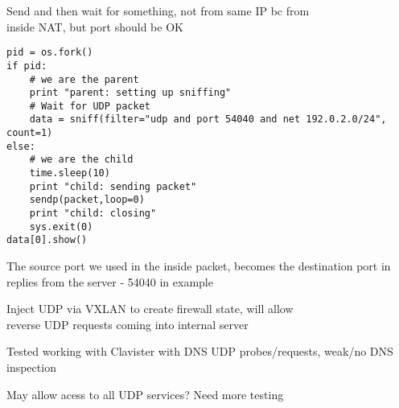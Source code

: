 \documentclass[Screen16to9,17pt,footrule]{foils}
\begin{document}
Send and then wait for something, not from same IP bc from\\
inside NAT, but port should be OK
\begin{verbatim}
pid = os.fork()
if pid:
    # we are the parent
    print "parent: setting up sniffing"
    # Wait for UDP packet
    data = sniff(filter="udp and port 54040 and net 192.0.2.0/24", count=1)
else:
    # we are the child
    time.sleep(10)
    print "child: sending packet"
    sendp(packet,loop=0)
    print "child: closing"
    sys.exit(0)
data[0].show()
\end{verbatim}

The source port we used in the inside packet, becomes the destination port in replies from the server - 54040 in example



Inject UDP via VXLAN to create firewall state, will allow\\
reverse UDP requests coming into internal server


{\small Tested working with Clavister with DNS UDP probes/requests, weak/no DNS inspection
\vskip 5mm
\centerline{May allow acess to all UDP services? Need more testing}}
\end{document}

